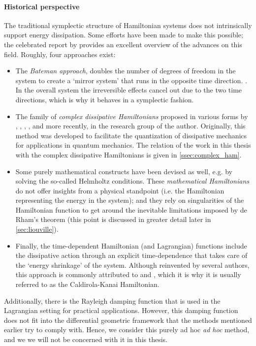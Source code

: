 \paragraph{Historical perspective} The traditional symplectic structure of Hamiltonian systems does not intrinsically support energy dissipation. Some efforts have been made to make this possible; the celebrated report by \citet{Dekker1981} provides an excellent overview of the advances on this field. Roughly, four approaches exist:
\begin{itemize}
    \item The \emph{Bateman approach}, doubles the number of degrees of freedom in the system to create a `mirror system' that runs in the opposite time direction. \cite{Bateman1931}. In the overall system the irreversible effects cancel out due to the two time directions, which is why it behaves in a symplectic fashion.
    \item The family of \emph{complex dissipative Hamiltonians} proposed in various forms by \citet{Bopp1974}, \citet{Dekker1975}, \citet{Dedene1980}, \citet{Rajeev2007}, and more recently, \citet{Hutters2020b} in the research group of the author. Originally, this method was developed to facilitate the quantization of dissipative mechanics for applications in quantum mechanics. The relation of the work in this thesis with the complex dissipative Hamiltonians is given in \cref{ssec:complex_ham}.
    \item Some purely mathematical constructs have been devised as well, e.g. by \citet{Havas1957} solving the so-called Helmholtz conditions. These \emph{mathematical Hamiltonians} do not offer insights from a physical standpoint (i.e. the Hamiltonian representing the energy in the system); and they rely on singularities of the Hamiltonian function to get around the inevitable limitations imposed by de Rham's theorem (this point is discussed in greater detail later in \cref{sec:liouville}).
    \item Finally, the time-dependent Hamiltonian (and Lagrangian) functions include the dissipative action through an explicit time-dependence that takes care of the `energy shrinkage' of the system. Although reinvented by several authors, this approach is commonly attributed to \citet{Caldirola1941} and \citet{Kanai1948}, which it is why it is usually referred to as the Caldirola-Kanai Hamiltonian.
\end{itemize}
Additionally, there is the Rayleigh damping function that is used in the Lagrangian setting for practical applications. However, this damping function does not fit into the differential geometric framework that the methods mentioned earlier try to comply with. Hence, we consider this purely ad hoc \emph{ad hoc} method, and we we will not be concerned with it in this thesis. \cite{Goldstein2011}

